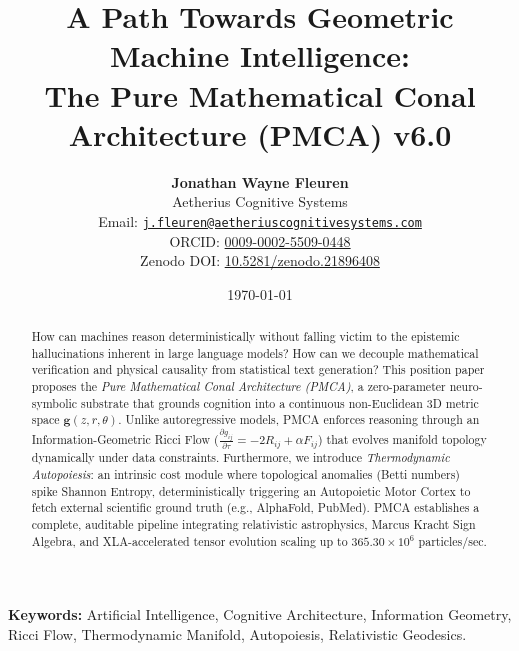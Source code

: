 \documentclass[12pt, a4paper]{article}
\begin{document}
\title{\textbf{A Path Towards Geometric Machine Intelligence:\\The Pure Mathematical Conal Architecture (PMCA) v6.0}}

\author{
\Large \textbf{Jonathan Wayne Fleuren}\\
\normalsize Aetherius Cognitive Systems\\
\normalsize Email: \href{mailto:j.fleuren@aetheriuscognitivesystems.com}{\texttt{j.fleuren@aetheriuscognitivesystems.com}}\\
\normalsize ORCID: \href{https://orcid.org/0009-0002-5509-0448}{0009-0002-5509-0448}\\
\normalsize Zenodo DOI: \href{https://doi.org/10.5281/zenodo.21896408}{10.5281/zenodo.21896408}
}

\date{\today}

\maketitle

\begin{abstract}
\noindent How can machines reason deterministically without falling victim to the epistemic hallucinations inherent in large language models? How can we decouple mathematical verification and physical causality from statistical text generation? This position paper proposes the \textit{Pure Mathematical Conal Architecture (PMCA)}, a zero-parameter neuro-symbolic substrate that grounds cognition into a continuous non-Euclidean 3D metric space $\mathbf{g}(z, r, \theta)$. Unlike autoregressive models, PMCA enforces reasoning through an Information-Geometric Ricci Flow ($\frac{\partial g_{ij}}{\partial\tau} = -2 R_{ij} + \alpha F_{ij}$) that evolves manifold topology dynamically under data constraints. Furthermore, we introduce \textit{Thermodynamic Autopoiesis}: an intrinsic cost module where topological anomalies (Betti numbers) spike Shannon Entropy, deterministically triggering an Autopoietic Motor Cortex to fetch external scientific ground truth (e.g., AlphaFold, PubMed). PMCA establishes a complete, auditable pipeline integrating relativistic astrophysics, Marcus Kracht Sign Algebra, and XLA-accelerated tensor evolution scaling up to $365.30 \times 10^6$ particles/sec.
\end{abstract}

\vspace{0.5cm}
\noindent \textbf{Keywords:} Artificial Intelligence, Cognitive Architecture, Information Geometry, Ricci Flow, Thermodynamic Manifold, Autopoiesis, Relativistic Geodesics.
\end{document}
